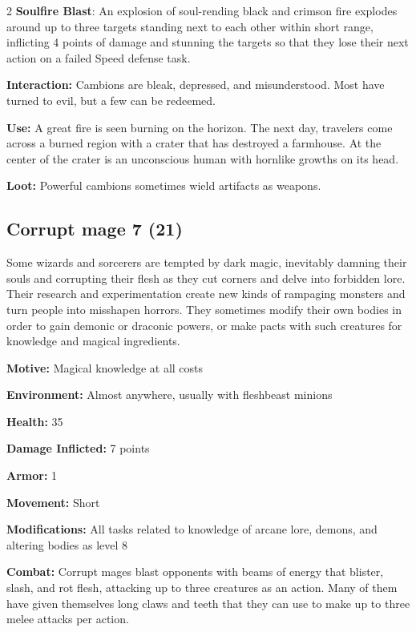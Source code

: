 \begin{multicols}{2}
\textbf{Soulfire Blast}: An explosion of soul-rending black and crimson fire explodes around up to three targets standing next to each other within short range, inflicting 4 points of damage and stunning the targets so that they lose their next action on a failed Speed defense task.

\textbf{Interaction:} Cambions are bleak, depressed, and misunderstood. Most have turned to evil, but a few can be redeemed.

\textbf{Use:} A great fire is seen burning on the horizon. The next day, travelers come across a burned region with a crater that has destroyed a farmhouse. At the center of the crater is an unconscious human with hornlike growths on its head.

\textbf{Loot:} Powerful cambions sometimes wield artifacts as weapons.

\subsection{Corrupt mage 7 (21)}

Some wizards and sorcerers are tempted by dark magic, inevitably damning their souls and corrupting their flesh as they cut corners and delve into forbidden lore. Their research and experimentation create new kinds of rampaging monsters and turn people into misshapen horrors. They sometimes modify their own bodies in order to gain demonic or draconic powers, or make pacts with such creatures for knowledge and magical ingredients. 

\textbf{Motive:} Magical knowledge at all costs 

\textbf{Environment:} Almost anywhere, usually with fleshbeast minions 

\textbf{Health:} 35 

\textbf{Damage Inflicted:} 7 points 

\textbf{Armor:} 1 

\textbf{Movement:} Short 

\textbf{Modifications:} All tasks related to knowledge of arcane lore, demons, and altering bodies as level 8 

\textbf{Combat:} Corrupt mages blast opponents with beams of energy that blister, slash, and rot flesh, attacking up to three creatures as an action. Many of them have given themselves long claws and teeth that they can use to make up to three melee attacks per action. 


\end{multicols}
